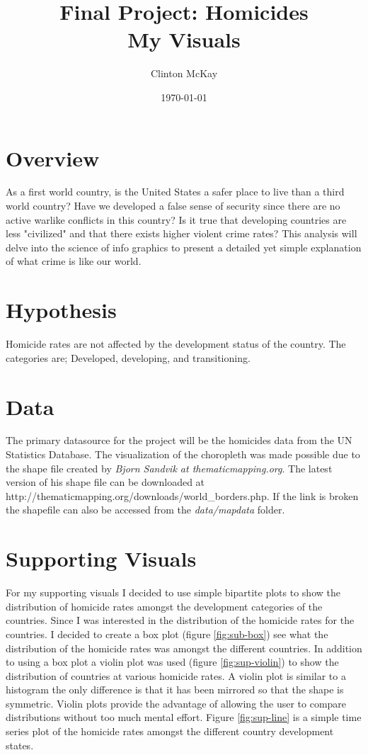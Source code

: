 \documentclass[12pt]{article}
\title{Final Project: Homicides\\{\Large My Visuals}}
\date{\today}
\author{Clinton McKay}
\begin{document}
\maketitle

\section{Overview}
As a first world country, is the United States a safer place to live than a third world country? Have we developed a false sense of security since there are no active warlike conflicts in this country? Is it true that developing countries are less "civilized" and that there exists higher violent crime rates? This analysis will delve into the science of info graphics to present a detailed yet simple explanation of what crime is like our world. 

\section{Hypothesis}
Homicide rates are not affected by the development status of the country. The categories are; Developed, developing, and transitioning.

\section{Data}
The primary datasource for the project will be the homicides data from the UN Statistics Database. The visualization of the choropleth was made possible due to the shape file created by {\em Bjorn Sandvik at thematicmapping.org}. The latest version of his shape file can be downloaded at http://thematicmapping.org/downloads/world\_borders.php. If the link is broken the shapefile can also be accessed from the {\em data/mapdata} folder. 

\section{Supporting Visuals}
For my supporting visuals I decided to use simple bipartite plots to show the distribution of homicide rates amongst the development categories of the countries. Since I was interested in the distribution of the homicide rates for the countries. I decided to create a box plot (figure \ref{fig:sub-box}) see what the distribution of the homicide rates was amongst the different countries. In addition to using a box plot a violin plot was used (figure \ref{fig:sup-violin}) to show the distribution of countries at various homicide rates. A violin plot is similar to a histogram the only difference is that it has been mirrored so that the shape is symmetric. Violin plots provide the advantage of allowing the user to compare distributions without too much mental effort. Figure \ref{fig:sup-line} is a simple time series plot of the homicide rates amongst the different country development states.  
\end{document}
